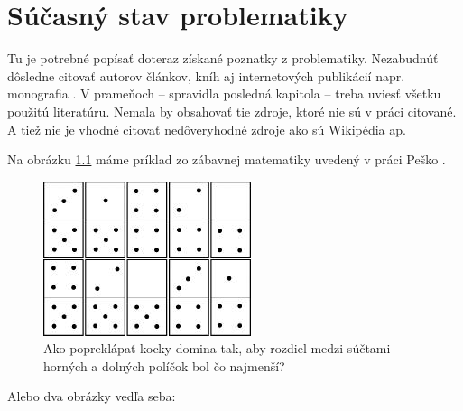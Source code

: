 \chapter{Súčasný stav problematiky}

Tu je potrebné popísať doteraz získané poznatky z problematiky.
Nezabudnúť dôsledne citovať autorov článkov, kníh aj internetových publikácií
napr. monografia \cite{berman}.
V prameňoch -- spravidla posledná kapitola -- treba uviesť všetku použitú literatúru.
Nemala by obsahovať tie zdroje, ktoré nie sú v práci citované.
A tiež nie je vhodné citovať nedôveryhodné zdroje ako sú Wikipédia ap.

Na obrázku \ref{obr1} máme príklad zo zábavnej matematiky uvedený v práci Peško \cite{pes2}.

\begin{figure}[ht]
\begin{center}
\begin{minipage}{0.7\linewidth}
\begin{center}
\includegraphics[width=.8\textwidth]{domino.jpg}
\caption{Ako popreklápať kocky domina tak, aby rozdiel medzi
súčtami horných a dolných políčok bol čo najmenší? }
\label{obr1}
\end{center}
\end{minipage}
\end{center}
\end{figure}

Alebo dva obrázky vedľa seba:

